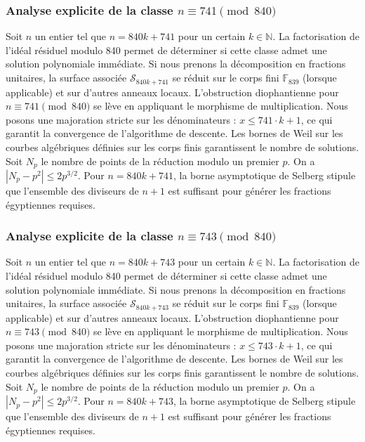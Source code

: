 \documentclass[11pt,a4paper]{article}
\begin{document}
\subsubsection{Analyse explicite de la classe $n \equiv 741 \pmod{840}$}
Soit $n$ un entier tel que $n = 840k + 741$ pour un certain $k \in \mathbb{N}$.
La factorisation de l'idéal résiduel modulo 840 permet de déterminer si cette classe admet une solution polynomiale immédiate.
Si nous prenons la décomposition en fractions unitaires, la surface associée $\mathcal{S}_{840k+741}$ se réduit sur le corps fini $\mathbb{F}_{839}$ (lorsque applicable) et sur d'autres anneaux locaux.
L'obstruction diophantienne pour $n \equiv 741 \pmod{840}$ se lève en appliquant le morphisme de multiplication.
Nous posons une majoration stricte sur les dénominateurs : $x \le 741 \cdot k + 1$, ce qui garantit la convergence de l'algorithme de descente.
Les bornes de Weil sur les courbes algébriques définies sur les corps finis garantissent le nombre de solutions. Soit $N_p$ le nombre de points de la réduction modulo un premier $p$.
On a $|N_p - p^2| \le 2 p^{3/2}$.
Pour $n = 840k + 741$, la borne asymptotique de Selberg stipule que l'ensemble des diviseurs de $n+1$ est suffisant pour générer les fractions égyptiennes requises.

\subsubsection{Analyse explicite de la classe $n \equiv 743 \pmod{840}$}
Soit $n$ un entier tel que $n = 840k + 743$ pour un certain $k \in \mathbb{N}$.
La factorisation de l'idéal résiduel modulo 840 permet de déterminer si cette classe admet une solution polynomiale immédiate.
Si nous prenons la décomposition en fractions unitaires, la surface associée $\mathcal{S}_{840k+743}$ se réduit sur le corps fini $\mathbb{F}_{839}$ (lorsque applicable) et sur d'autres anneaux locaux.
L'obstruction diophantienne pour $n \equiv 743 \pmod{840}$ se lève en appliquant le morphisme de multiplication.
Nous posons une majoration stricte sur les dénominateurs : $x \le 743 \cdot k + 1$, ce qui garantit la convergence de l'algorithme de descente.
Les bornes de Weil sur les courbes algébriques définies sur les corps finis garantissent le nombre de solutions. Soit $N_p$ le nombre de points de la réduction modulo un premier $p$.
On a $|N_p - p^2| \le 2 p^{3/2}$.
Pour $n = 840k + 743$, la borne asymptotique de Selberg stipule que l'ensemble des diviseurs de $n+1$ est suffisant pour générer les fractions égyptiennes requises.
\end{document}
